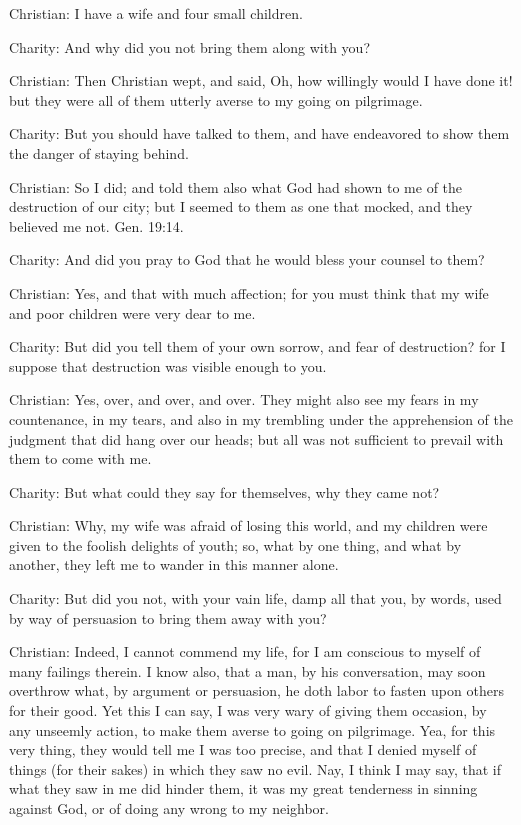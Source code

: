 Christian: I have a wife and four small children.

Charity: And why did you not bring them along with you?

Christian: Then Christian wept, and said, Oh, how willingly would I have done it! but they were all of them utterly averse to my going on pilgrimage.

Charity: But you should have talked to them, and have endeavored to show them the danger of staying behind.

Christian: So I did; and told them also what God had shown to me of the destruction of our city; but I seemed to them as one that mocked, and they believed me not. Gen. 19:14.

Charity: And did you pray to God that he would bless your counsel to them?

Christian: Yes, and that with much affection; for you must think that my wife and poor children were very dear to me.

Charity: But did you tell them of your own sorrow, and fear of destruction? for I suppose that destruction was visible enough to you.

Christian: Yes, over, and over, and over. They might also see my fears in my countenance, in my tears, and also in my trembling under the apprehension of the judgment that did hang over our heads; but all was not sufficient to prevail with them to come with me.

Charity: But what could they say for themselves, why they came not?

Christian: Why, my wife was afraid of losing this world, and my children were given to the foolish delights of youth; so, what by one thing, and what by another, they left me to wander in this manner alone.

Charity: But did you not, with your vain life, damp all that you, by words, used by way of persuasion to bring them away with you?

Christian: Indeed, I cannot commend my life, for I am conscious to myself of many failings therein. I know also, that a man, by his conversation, may soon overthrow what, by argument or persuasion, he doth labor to fasten upon others for their good. Yet this I can say, I was very wary of giving them occasion, by any unseemly action, to make them averse to going on pilgrimage. Yea, for this very thing, they would tell me I was too precise, and that I denied myself of things (for their sakes) in which they saw no evil. Nay, I think I may say, that if what they saw in me did hinder them, it was my great tenderness in sinning against God, or of doing any wrong to my neighbor.

